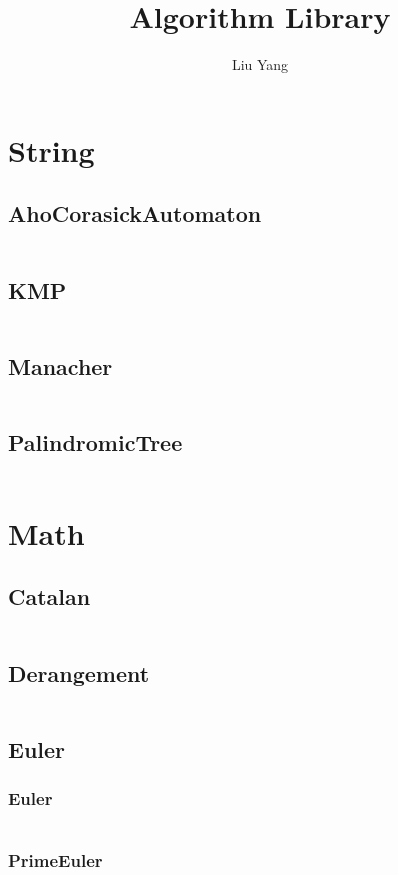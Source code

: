 \documentclass[a4paper,11pt]{article}
\author{Liu Yang}
\title{Algorithm Library}
\begin{document}
 
\maketitle
\newpage
\tableofcontents
\newpage

\section{String}
\subsection{AhoCorasickAutomaton}
\inputminted[breaklines]{c++}{Template/01++String/+AhoCorasickAutomaton.cpp}
\subsection{KMP}
\inputminted[breaklines]{c++}{Template/01++String/+KMP.cpp}
\subsection{Manacher}
\inputminted[breaklines]{c++}{Template/01++String/+Manacher.cpp}
\subsection{PalindromicTree}
\inputminted[breaklines]{c++}{Template/01++String/+PalindromicTree.cpp}

\newpage
\section{Math}
\subsection{Catalan}
\inputminted[breaklines]{c++}{Template/02++Math/+Catalan.cpp}
\subsection{Derangement}
\inputminted[breaklines]{c++}{Template/02++Math/+Derangement.cpp}
\subsection{Euler}
\subsubsection{Euler}
\inputminted[breaklines]{c++}{Template/02++Math/+Euler/+Euler.cpp}
\subsubsection{PrimeEuler}
\inputminted[breaklines]{c++}{Template/02++Math/+Euler/+PrimeEuler.cpp}
\end{document}
